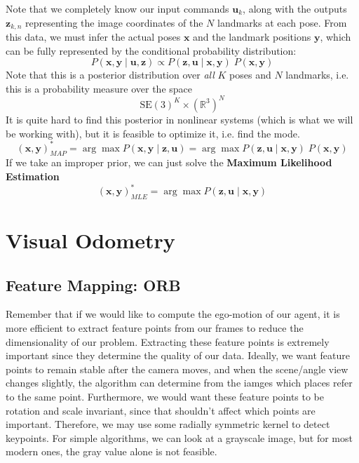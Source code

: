 \documentclass{article}
\newcounter{algo}[section]
\begin{document}
  Note that we completely know our input commands $\mathbf{u}_k$, along with the outputs $\mathbf{z}_{k, n}$ representing the image coordinates of the $N$ landmarks at each pose. From this data, we must infer the actual poses $\mathbf{x}$ and the landmark positions $\mathbf{y}$, which can be fully represented by the conditional probability distribution: 
  \begin{equation}
    P(\mathbf{x}, \mathbf{y} \mid \mathbf{u}, \mathbf{z}) \propto P(\mathbf{z}, \mathbf{u} \mid \mathbf{x}, \mathbf{y}) \; P (\mathbf{x}, \mathbf{y})
  \end{equation}
  Note that this is a posterior distribution over \textit{all} $K$ poses and $N$ landmarks, i.e. this is a probability measure over the space 
  \begin{equation}
    \mathrm{SE}(3)^K \times (\mathbb{R}^3)^N
  \end{equation}
  It is quite hard to find this posterior in nonlinear systems (which is what we will be working with), but it is feasible to optimize it, i.e. find the mode. 
  \begin{equation}
    (\mathbf{x}, \mathbf{y})^*_{MAP} = \arg \max P(\mathbf{x}, \mathbf{y} \mid \mathbf{z}, \mathbf{u}) = \arg \max P(\mathbf{z}, \mathbf{u} \mid \mathbf{x}, \mathbf{y}) \; P(\mathbf{x}, \mathbf{y})
  \end{equation}
  If we take an improper prior, we can just solve the \textbf{Maximum Likelihood Estimation} 
  \begin{equation}
    (\mathbf{x}, \mathbf{y})^*_{MLE} = \arg \max P(\mathbf{z}, \mathbf{u} \mid \mathbf{x}, \mathbf{y})
  \end{equation}

\section{Visual Odometry}

  \subsection{Feature Mapping: ORB}

  Remember that if we would like to compute the ego-motion of our agent, it is more efficient to extract feature points from our frames to reduce the dimensionality of our problem. Extracting these feature points is extremely important since they determine the quality of our data. Ideally, we want feature points to remain stable after the camera moves, and when the scene/angle view changes slightly, the algorithm can determine from the iamges which places refer to the same point. Furthermore, we would want these feature points to be rotation and scale invariant, since that shouldn't affect which points are important. Therefore, we may use some radially symmetric kernel to detect keypoints. For simple algorithms, we can look at a grayscale image, but for most modern ones, the gray value alone is not feasible.
\end{document}
